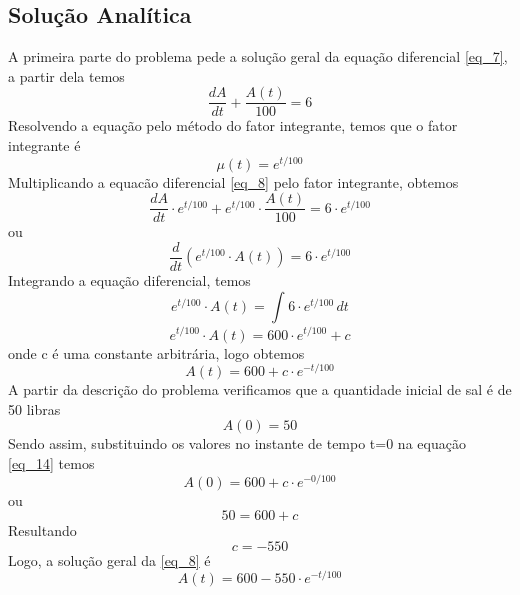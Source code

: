 \documentclass[12pt]{article}
\begin{document}
\subsection{Solução Analítica}
A primeira parte do problema pede a solução geral da equação diferencial \ref{eq_7}, a partir dela temos
\begin{equation}
    \frac{dA}{dt} + \frac{A(t)}{100} = 6 
\label{eq_8}
\end{equation}
Resolvendo a equação pelo método do fator integrante, temos que o fator integrante é
\begin{equation}
    \mu(t) = e^{t/100}
\end{equation}
Multiplicando a equacão diferencial \ref{eq_8} pelo fator integrante, obtemos
\begin{equation}
    \frac{dA}{dt} \cdot e^{t/100} + e^{t/100}\cdot \frac{A(t)}{100} = 6 \cdot e^{t/100}
\end{equation}
ou
\begin{equation}
    \frac{d}{dt}(e^{t/100}\cdot A(t)) = 6 \cdot e^{t/100}
\label{eq_11}
\end{equation}
Integrando a equação diferencial, temos
\begin{equation}
    e^{t/100}\cdot A(t) = \int_{}^{} 6 \cdot e^{t/100}\, dt
\end{equation}
\begin{equation}
    e^{t/100}\cdot A(t) = 600 \cdot e^{t/100} + c
\end{equation}
onde c é uma constante arbitrária, logo obtemos
\begin{equation}
    A(t) = 600 + c \cdot e^{-t/100}
\label{eq_14}
\end{equation}
A partir da descrição do problema verificamos que a quantidade inicial de sal é de 50 libras
\begin{equation}
    A(0) = 50
\end{equation}
Sendo assim, substituindo os valores no instante de tempo t=0 na equação \ref{eq_14} temos
\begin{equation}
    A(0) = 600 + c \cdot e^{-0/100}
\end{equation}
ou
\begin{equation}
    50 = 600 + c
\end{equation}
Resultando
\begin{equation}
    c = -550
\end{equation}
Logo, a solução geral da \ref{eq_8} é
\begin{equation}
    A(t) = 600 - 550 \cdot e^{-t/100}
\label{eq_19}
\end{equation}
\end{document}
